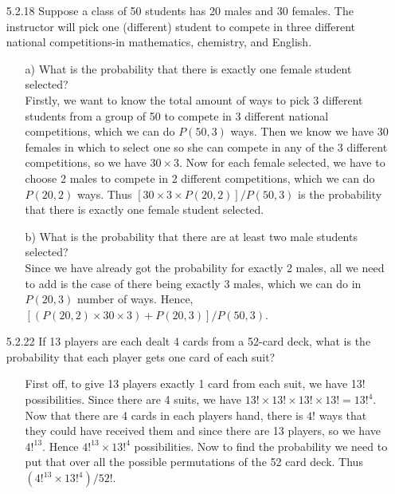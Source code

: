 \documentclass[12pt]{article}
\begin{document}
\begin{enumerate}
\item[5.2.18] Suppose a class of 50 students has 20 males and 30 females. The instructor will pick one (different) student to compete in three different national competitions-in mathematics, chemistry, and English.
\begin{enumerate}
\item[a)] What is the probability that there is exactly one female student selected? \\ 
Firstly, we want to know the total amount of ways to pick 3 different students from a group of 50 to 
compete in 3 different national competitions, which we can do $P(50, 3)$ ways. Then we know we have
30 females in which to select one so she can compete in any of the 3 different competitions, so we have
$30 \times 3$. Now for each female selected, we have to choose 2 males to compete in 2 different competitions, 
which we can do $P(20, 2)$ ways. Thus $[30 \times 3 \times P(20, 2)]/P(50, 3)$ is the probability that 
there is exactly one female student selected.
\item[b)] What is the probability that there are at least two male students selected? \\
Since we have already got the probability for exactly 2 males, all we need to add is the case
of there being exactly 3 males, which we can do in $P(20, 3)$ number of ways. Hence, 
$[(P(20, 2) \times 30 \times 3) + P(20, 3)]/P(50, 3)$.
\end{enumerate}

\item[5.2.22] If 13 players are each dealt 4 cards from a 52-card deck, what is the probability that each player gets one card of each suit? 
\begin{enumerate}
\item[] First off, to give 13 players exactly 1 card from each suit, we have 13! possibilities. Since
there are 4 suits, we have $13! \times 13! \times 13! \times 13! = 13!^4$. Now that there are 4 cards in
each players hand, there is $4!$ ways that they could have received them and since there are 13 players, so we
have $4!^{13}$. Hence $4!^{13} \times 13!^4$ possibilities. Now to find the probability we need to put that
over all the possible permutations of the 52 card deck. Thus $(4!^{13} \times 13!^4)/52!$.
\end{enumerate}


\end{enumerate}
\end{document}
